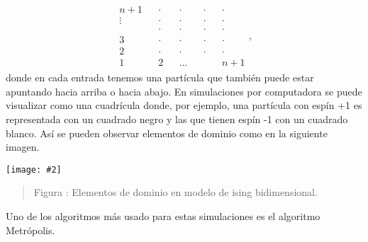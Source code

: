 \documentclass[portrait, a0b,final]{a0poster}%
\numberwithin{equation}{section}
\newenvironment{poster}{
  \begin{center}
  \begin{minipage}[c]{0.98\textwidth}
}{
  \end{minipage}
  \end{center}
}
\newenvironment{pcolumn}[1]{
  \begin{minipage}{#1\textwidth}
  \begin{center}
}{
  \end{center}
  \end{minipage}
}
\newcommand{\myfig}[3][0]{
\begin{center}
  \vspace{1.5cm}
  \texttt{[image: \#2]}
  \nobreak\medskip
\end{center}}
\newcommand{\mycaption}[1]{
  \vspace{0.5cm}
  \begin{quote}
    {{\sc Figura} \arabic{figure}: #1}
  \end{quote}
  \vspace{1cm}
  \stepcounter{figure}
}
\begin{document}
\begin{poster}
\begin{center}
\begin{pcolumn}{0.32}
{  %
\begin{eqnarray}
  \begin{matrix}
  n+1 && \cdot && \cdot && \cdot && \cdot  \\
  \vdots && \cdot && \cdot && \cdot && \cdot  \\
    && \cdot && \cdot && \cdot && \cdot  \\
  3 && \cdot && \cdot && \cdot && \cdot  \\
  2 && \cdot && \cdot && \cdot && \cdot  \\
  1 && 2 &&   \dots&&  && n+1
  \end{matrix}, \nonumber
  \end{eqnarray}
  donde en cada entrada tenemos una partícula que también puede estar apuntando hacia arriba o hacia abajo. En simulaciones por computadora se puede visualizar como una cuadrícula donde, por ejemplo, una part\'icula con esp\'in +1 es representada con un cuadrado negro y las que tienen esp\'in -1 con un cuadrado blanco. As\'i se pueden observar elementos de dominio como en la siguiente imagen.

  \begin{center}    
    \myfig{elementosDeDominio.ps}{.75}
    \mycaption{Elementos de dominio en modelo de ising bidimensional.}
  \end{center}

  Uno de los algoritmos m\'as usado para estas simulaciones es el algoritmo Metr\'opolis.

}
\end{pcolumn}
\end{center}
\end{poster}
\end{document}
